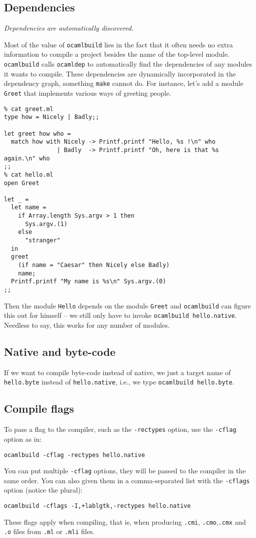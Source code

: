 \documentclass[9pt]{article}
\newcommand{\ocb}{\texttt{ocamlbuild}\xspace}
\begin{document}
\subsection{Dependencies}
{\em Dependencies are automatically discovered.}

Most of the value of \ocb lies in the fact that it often needs no extra
information to compile a project besides the name of the top-level module.
\ocb calls \texttt{ocamldep} to automatically find the dependencies of any
modules it wants to compile.  These dependencies are dynamically incorporated
in the dependency graph, something \texttt{make} cannot do.
For instance, let's add a module \texttt{Greet} that implements various ways of
greeting people.
\begin{verbatim}
% cat greet.ml
type how = Nicely | Badly;;

let greet how who =
  match how with Nicely -> Printf.printf "Hello, %s !\n" who
               | Badly  -> Printf.printf "Oh, here is that %s again.\n" who
;;
% cat hello.ml
open Greet

let _ =
  let name =
    if Array.length Sys.argv > 1 then
      Sys.argv.(1)
    else
      "stranger"
  in
  greet
    (if name = "Caesar" then Nicely else Badly)
    name;
  Printf.printf "My name is %s\n" Sys.argv.(0)
;;
\end{verbatim}
Then the module \texttt{Hello} depends on the module \texttt{Greet} and \ocb can
figure this out for himself -- we still only have to invoke \texttt{\ocb
hello.native}.  Needless to say, this works for any number of modules.
\subsection{Native and byte-code}
If we want to compile byte-code instead of native, we just a target name of
\texttt{hello.byte} instead of \texttt{hello.native}, i.e., we type
\texttt{\ocb hello.byte}.
\subsection{Compile flags}
To pass a flag to the compiler, such as the \texttt{-rectypes} option,
use the \texttt{-cflag} option as in:
\begin{verbatim}
ocamlbuild -cflag -rectypes hello.native
\end{verbatim}
You can put multiple \texttt{-cflag} options, they will be passed to the compiler
in the same order.  You can also given them in a comma-separated list with the
\texttt{-cflags} option (notice the plural):
\begin{verbatim}
ocamlbuild -cflags -I,+lablgtk,-rectypes hello.native
\end{verbatim}
These flags apply when compiling, that is, when producing \texttt{.cmi},
\texttt{.cmo},\texttt{.cmx} and \texttt{.o} files from \texttt{.ml} or
\texttt{.mli} files.
\end{document}
